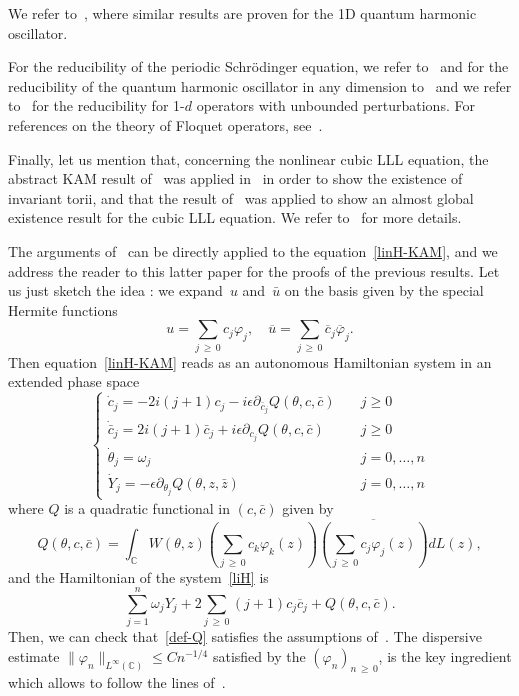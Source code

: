 \documentclass[AHL,Unicode,published]{cedram}
\newcommand{\C}{\mathbb{C}}
\newcommand*\eps{\epsilon}
\newcommand*\dis{\displaystyle}
\newcommand{\ov}{\overline}
\newcommand{\<}{\langle}
\renewcommand{\>}{\rangle}
\renewcommand{\phi}{\varphi}
\begin{document}
We refer to~\cite[Section~7]{Grebert-Thomann}, where similar results are proven for the 1D quantum harmonic oscillator.

For the reducibility of the periodic Schr\"odinger equation, we refer to~\cite{ElKuk2} and for the reducibility of the quantum harmonic oscillator in any dimension to~\cite{BGMR2,GP,LW} and we refer to~\cite{Bambusi2,Bambusi1,Bambusi3} for the reducibility for 1-$d$ operators with unbounded perturbations. For references on the theory of Floquet operators, see~\cite{Eli, Wang}.

Finally, let us mention that, concerning the nonlinear cubic LLL equation, the abstract KAM result of~\cite{Grebert-Thomann} was applied in~\cite[Theorem~4.3]{GGT} in order to show the existence of invariant torii, and that the result of~\cite{GIP} was applied to show an almost global existence result for the cubic LLL equation. We refer to~\cite[Section~4.2]{GGT} for more details.


The arguments of~\cite[Section~7]{Grebert-Thomann} can be directly applied to the equation~\eqref{linH-KAM}, and we address the reader to this latter paper for the proofs of the previous results. Let us just sketch the idea : we expand~$u$ and~$\bar u$ on the basis given by the special Hermite functions
\[
\dis u=\sum_{j\,\geq\,0} c_j {\phi_j}, \quad \dis \ov{u}=\sum_{j\,\geq\,0} \ov{c}_j \ov{\phi}_j.
\]
Then equation~\eqref{linH-KAM} reads as an autonomous Hamiltonian system in an extended phase space
\begin{equation}\label{liH}
\begin{cases}
\dot c_j=-2i(j+1) c_j- i\eps \partial_{\bar c_j}Q(\theta,c,\bar c)\quad & j\geq 0 \\[5pt]
\dot{\bar c}_j= 2i(j+1)\bar c_j+ i\eps \partial_{ c_j}Q(\theta,c,\bar c) & j\geq 0\\[5pt]
\dot \theta_j= \omega_j & j=0,\dots, n\\[5pt]
\dot Y_j= -\eps \partial_{ \theta_j}Q(\theta,z,\bar z) & j=0,\dots, n
\end{cases}
\end{equation}
where $Q$ is a quadratic functional in $(c,\bar c)$ given by
\begin{equation}\label{def-Q}
Q(\theta,c,\bar c)=\int_\C W(\theta,z)\left(\sum_{j\,\geq\,0} c_k \phi_k(z)\right) \ov{\left(\sum_{j\,\geq\,0} c_j {\phi_j(z)}\right)}dL(z),
\end{equation}
and the Hamiltonian of the system~\eqref{liH} is
\[
\sum_{j=1}^n \omega_j Y_j +2\sum_{j\,\geq\,0} (j+1) c_j\ov{c}_j+Q(\theta,c,\bar c).
\]
Then, we can check that~\eqref{def-Q} satisfies the assumptions of~\cite[Theorem~7.1]{Grebert-Thomann}. The dispersive estimate $\|\phi_n \|_{L^\infty(\C)} \leq C n^{-1/4}$ satisfied by the $(\phi_n)_{n\,\geq\,0}$, is the key ingredient which allows to follow the lines of~\cite[Section~7]{Grebert-Thomann}.
\end{document}
